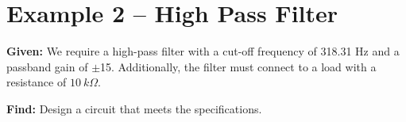 \documentclass{handout}
\begin{document}
\newpage
\clearpage
\pagebreak

\section{Example 2 -- High Pass Filter}

\noindent \textbf{Given:}  We require a high-pass filter with a cut-off frequency of 318.31 Hz and a passband gain of $\pm$15.  Additionally, the filter must connect to a load with a resistance of $10 \ k\Omega$.

\noindent \textbf{Find:}  Design a circuit that meets the specifications.

\end{document}
